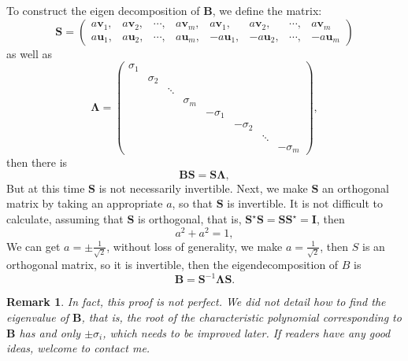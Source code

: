 \documentclass{article}
\newtheorem*{remark}{Remark}
\begin{document}
To construct the eigen decomposition of \( \bm{B} \), we define the matrix:
$$
\bm{S} = \begin{pmatrix}
a\bm{v}_1, &a\bm{v}_2, &\cdots, &a\bm{v}_m, &a\bm{v}_{1}, &a\bm{v}_{2}, &\cdots,&a\bm{v}_{m} \\
a\bm{u}_1, &a\bm{u}_2, &\cdots,&a\bm{u}_m, &-a\bm{u}_{1}, &-a\bm{u}_{2}, &\cdots, &-a\bm{u}_{m}
\end{pmatrix}
$$
as well as
$$
\bm{\Lambda} = 
 \begin{pmatrix}
   \sigma_{1} &  &  &&&&&\\ 
   & \sigma_{2} &  & &&&&\\ 
   &  &  \ddots & &&&&\\ 
   &  &   & \sigma_{m} &&&&\\
   &  &   & &-\sigma_{1} && &\\
   &  &   & & & -\sigma_{2}&& \\
   &  &   & & & & \ddots &\\
   &  &   & & & & & -\sigma_{m}
 \end{pmatrix},
$$
then there is
$$
\bm{B} \bm{S} = \bm{S} \bm{\Lambda},
$$
But at this time $\bm{S}$ is not necessarily invertible. Next, we make $\bm{S}$ an orthogonal matrix by taking an appropriate $a$, so that $\bm{S}$ is invertible. It is not difficult to calculate, assuming that $\bm{S}$ is orthogonal, that is, $\bm{S}^{\star} \bm{S} = \bm{S} \bm{S}^{\star} = \bm{I}$, then
$$
a^2 + a^2 = 1,
$$
We can get $a = \pm \frac{1}{\sqrt{2}}$, without loss of generality, we make $a = \frac{1}{\sqrt{2}}$, then $S $ is an orthogonal matrix, so it is invertible, then the eigendecomposition of $B$ is
$$
\bm{B} = \bm{S}^{-1} \bm{\Lambda} \bm{S}.
$$





\begin{remark}
In fact, this proof is not perfect. We did not detail how to find the eigenvalue of $\bm{B}$, that is, the root of the characteristic polynomial corresponding to $\bm{B}$ has and only $\pm \sigma_i$, which needs to be improved later. If readers have any good ideas, welcome to contact me.
\end{remark}
\end{document}
